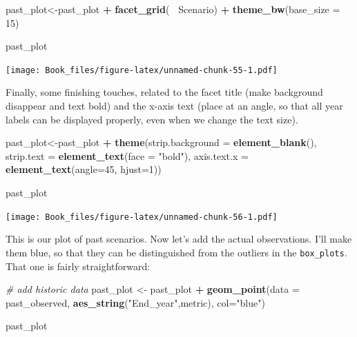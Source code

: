 \documentclass[
]{book}
\newenvironment{Shaded}{\begin{snugshade}}{\end{snugshade}}
\newcommand{\CommentTok}[1]{\textcolor[rgb]{0.56,0.35,0.01}{\textit{#1}}}
\newcommand{\DataTypeTok}[1]{\textcolor[rgb]{0.13,0.29,0.53}{#1}}
\newcommand{\DecValTok}[1]{\textcolor[rgb]{0.00,0.00,0.81}{#1}}
\newcommand{\KeywordTok}[1]{\textcolor[rgb]{0.13,0.29,0.53}{\textbf{#1}}}
\newcommand{\NormalTok}[1]{#1}
\newcommand{\OperatorTok}[1]{\textcolor[rgb]{0.81,0.36,0.00}{\textbf{#1}}}
\newcommand{\StringTok}[1]{\textcolor[rgb]{0.31,0.60,0.02}{#1}}
\begin{document}
\begin{Shaded}
\begin{Highlighting}[]
\NormalTok{past_plot<-past_plot }\OperatorTok{+}
\StringTok{  }\KeywordTok{facet_grid}\NormalTok{(}\OperatorTok{~}\StringTok{ }\NormalTok{Scenario) }\OperatorTok{+}
\StringTok{  }\KeywordTok{theme_bw}\NormalTok{(}\DataTypeTok{base_size =} \DecValTok{15}\NormalTok{) }
  
\NormalTok{past_plot}
\end{Highlighting}
\end{Shaded}

\texttt{[image: Book\_files/figure-latex/unnamed-chunk-55-1.pdf]}

Finally, some finishing touches, related to the facet title (make background disappear and text bold) and the x-axis text (place at an angle, so that all year labels can be displayed properly, even when we change the text size).

\begin{Shaded}
\begin{Highlighting}[]
\NormalTok{past_plot<-past_plot }\OperatorTok{+}\StringTok{  }
\StringTok{  }\KeywordTok{theme}\NormalTok{(}\DataTypeTok{strip.background =} \KeywordTok{element_blank}\NormalTok{(),}
        \DataTypeTok{strip.text =} \KeywordTok{element_text}\NormalTok{(}\DataTypeTok{face =} \StringTok{"bold"}\NormalTok{),}
        \DataTypeTok{axis.text.x =} \KeywordTok{element_text}\NormalTok{(}\DataTypeTok{angle=}\DecValTok{45}\NormalTok{, }\DataTypeTok{hjust=}\DecValTok{1}\NormalTok{)) }

\NormalTok{past_plot}
\end{Highlighting}
\end{Shaded}

\texttt{[image: Book\_files/figure-latex/unnamed-chunk-56-1.pdf]}

This is our plot of past scenarios. Now let's add the actual observations. I'll make them blue, so that they can be distinguished from the outliers in the \texttt{box\_plots}. That one is fairly straightforward:

\begin{Shaded}
\begin{Highlighting}[]
\CommentTok{# add historic data}
\NormalTok{past_plot <-}\StringTok{ }\NormalTok{past_plot }\OperatorTok{+}
\StringTok{  }\KeywordTok{geom_point}\NormalTok{(}\DataTypeTok{data =}\NormalTok{ past_observed,}
             \KeywordTok{aes_string}\NormalTok{(}\StringTok{"End_year"}\NormalTok{,metric),}
             \DataTypeTok{col=}\StringTok{"blue"}\NormalTok{)}

\NormalTok{past_plot}
\end{Highlighting}
\end{Shaded}
\end{document}
